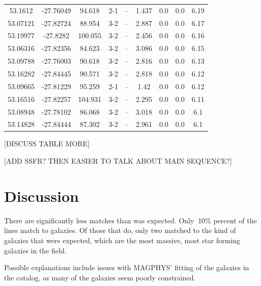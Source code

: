 \begin{table}
\begin{tabular}{ccccccccc}
53.1612 & -27.76049 & 94.618 & 2-1 & -- & 1.437 & 0.0 & 0.0 & 6.19 \\
53.07121 & -27.82724 & 88.954 & 3-2 & -- & 2.887 & 0.0 & 0.0 & 6.17 \\
53.19977 & -27.8282 & 100.055 & 3-2 & -- & 2.456 & 0.0 & 0.0 & 6.16 \\
53.06316 & -27.82356 & 84.623 & 3-2 & -- & 3.086 & 0.0 & 0.0 & 6.15 \\
53.09788 & -27.76003 & 90.618 & 3-2 & -- & 2.816 & 0.0 & 0.0 & 6.13 \\
53.16282 & -27.84445 & 90.571 & 3-2 & -- & 2.818 & 0.0 & 0.0 & 6.12 \\
53.09665 & -27.81229 & 95.259 & 2-1 & -- & 1.42 & 0.0 & 0.0 & 6.12 \\
53.16516 & -27.82257 & 104.931 & 3-2 & -- & 2.295 & 0.0 & 0.0 & 6.11 \\
53.08948 & -27.78102 & 86.068 & 3-2 & -- & 3.018 & 0.0 & 0.0 & 6.1 \\
53.14828 & -27.84444 & 87.302 & 3-2 & -- & 2.961 & 0.0 & 0.0 & 6.1 \\
\end{tabular}
\end{table}\label{table:Catalog}

[DISCUSS TABLE MORE]

[ADD SSFR? THEN EASIER TO TALK ABOUT MAIN SEQUENCE?]

\section{Discussion}

There are significantly less matches than was expected. Only $~$10\% percent of the lines match to galaxies. Of those that do, only two matched to the kind of galaxies that were expected, which are the most massive, most star forming galaxies in the field. 

Possible explanations include issues with MAGPHYS' fitting of the galaxies in the catalog, as many of the galaxies seem poorly constrained. 